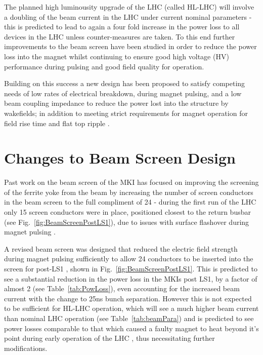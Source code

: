\documentclass[a4paper,
              ]{jacow}
\begin{document}
The planned high luminousity upgrade of the LHC (called HL-LHC) will involve a doubling of the beam current in the LHC under current nominal parameters \cite{HLLHCPara} - this is predicted to lead to again a four fold increase in the power loss to all devices in the LHC unless counter-measures are taken. To this end further improvements to the beam screen have been studied in order to reduce the power loss into the magnet whilst continuing to ensure good high voltage (HV) performance during pulsing and good field quality for operation.

Building on this success a new design has been proposed to satisfy competing needs of low rates of electrical breakdown, during magnet pulsing, and a low beam coupling impedance to reduce the power lost into the structure by wakefields; in addition to meeting strict requirements for magnet operation for field rise time and flat top ripple \cite{mkiUpgrade}. 


\section{Changes to Beam Screen Design}

Past work on the beam screen of the MKI has focused on improving the screening of the ferrite yoke from the beam by increasing the number of screen conductors in the beam screen to the full compliment of 24 - during the first run of the LHC only 15 screen conductors were in place, positioned closest to the return busbar (see Fig.~\ref{fig:BeamScreenPostLS1}), due to issues with surface flashover during magnet pulsing \cite{mki-ElecBreakdown}. 

A revised beam screen was designed that reduced the electric field strength during magnet pulsing sufficiently to allow 24 conductors to be inserted into the screen for post-LS1 \cite{mkiUpgrade}, shown in Fig.~\ref{fig:BeamScreenPostLS1}. This is predicted to see a substantial reduction in the power loss in the MKIs post LS1, by a factor of almost 2 (see Table~\ref{tab:PowLoss}), even accounting for the increased beam current with the change to 25ns bunch separation. However this is not expected to be sufficient for HL-LHC operation, which will see a much higher beam current than nominal LHC operation (see Table~\ref{tab:beamPara}) and is predicted to see power losses comparable to that which caused a faulty magnet to heat beyond it's point during early operation of the LHC \cite{mkiImp2014}, thus necessitating further modifications.
\end{document}
